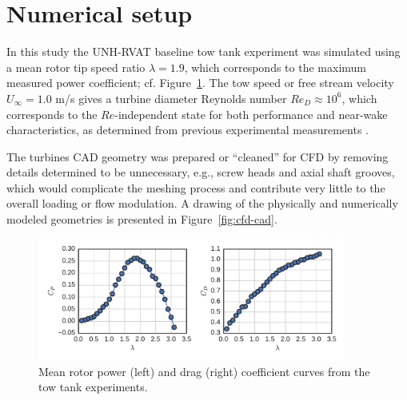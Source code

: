 \documentclass[aip,graphicx]{revtex4-1}
\begin{document}
\section{Numerical setup}

In this study the UNH-RVAT baseline tow tank experiment was simulated using a
mean rotor tip speed ratio $\lambda=1.9$, which corresponds to the maximum
measured power coefficient; cf. Figure~\ref{fig:exp-perf}. The tow speed or free
stream velocity $U_\infty=1.0$ m/s gives a turbine diameter Reynolds number
$Re_D \approx 10^6$, which corresponds to the $Re$-independent state for both
performance and near-wake characteristics, as determined from previous
experimental measurements \cite{Bachant2014, Bachant2016-Energies}.

The turbines CAD geometry was prepared or ``cleaned'' for CFD by removing
details determined to be unnecessary, e.g., screw heads and axial shaft grooves,
which would complicate the meshing process and contribute very little to the
overall loading or flow modulation. A drawing of the physically and numerically
modeled geometries is presented in Figure~\ref{fig:cfd-cad}.

\begin{figure}
    \centering

    \includegraphics[width=0.9\textwidth]{figures/exp_perf}

    \caption{Mean rotor power (left) and drag (right) coefficient curves from
        the tow tank experiments\cite{Bachant2016-RVAT-Re-dep}.}

    \label{fig:exp-perf}
\end{figure}
\end{document}
